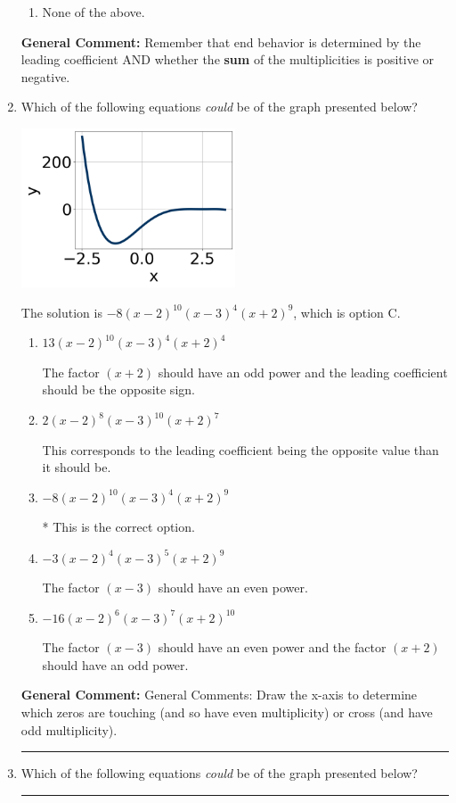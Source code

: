\documentclass{extbook}[14pt]
\newcommand{\litem}[1]{\item #1

\rule{\textwidth}{0.4pt}}
\begin{document}
\begin{enumerate}
{\begin{enumerate}[label=\Alph*.]
\begin{multicols}{2}
\end{multicols}\item None of the above.\end{enumerate}
\textbf{General Comment:} Remember that end behavior is determined by the leading coefficient AND whether the \textbf{sum} of the multiplicities is positive or negative.
}
\litem{
Which of the following equations \textit{could} be of the graph presented below?

\begin{center}
    \includegraphics[width=0.5\textwidth]{../Figures/polyGraphToFunctionCopyB.png}
\end{center}



The solution is \( -8(x - 2)^{10} (x - 3)^{4} (x + 2)^{9} \), which is option C.\begin{enumerate}[label=\Alph*.]
\item \( 13(x - 2)^{10} (x - 3)^{4} (x + 2)^{4} \)

The factor $(x + 2)$ should have an odd power and the leading coefficient should be the opposite sign.
\item \( 2(x - 2)^{8} (x - 3)^{10} (x + 2)^{7} \)

This corresponds to the leading coefficient being the opposite value than it should be.
\item \( -8(x - 2)^{10} (x - 3)^{4} (x + 2)^{9} \)

* This is the correct option.
\item \( -3(x - 2)^{4} (x - 3)^{5} (x + 2)^{9} \)

The factor $(x - 3)$ should have an even power.
\item \( -16(x - 2)^{6} (x - 3)^{7} (x + 2)^{10} \)

The factor $(x - 3)$ should have an even power and the factor $(x + 2)$ should have an odd power.
\end{enumerate}

\textbf{General Comment:} General Comments: Draw the x-axis to determine which zeros are touching (and so have even multiplicity) or cross (and have odd multiplicity).
}
\litem{
Which of the following equations \textit{could} be of the graph presented below?

}
\end{enumerate}
\end{document}
